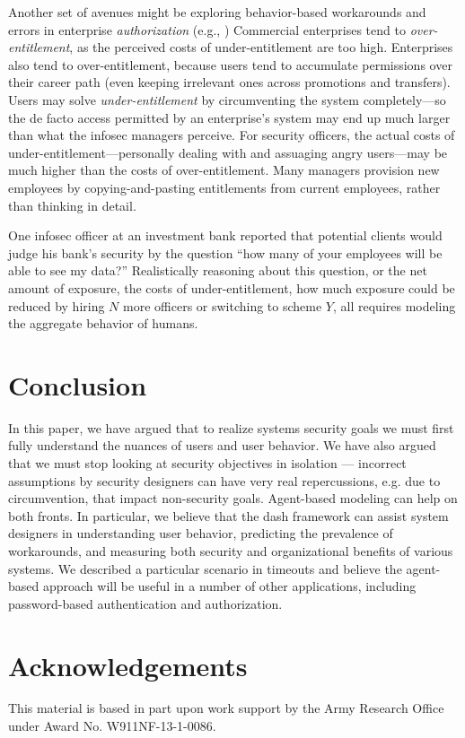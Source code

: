 \documentclass{acm_proc_article-sp}
\newcommand{\ignore}[1] {}
\begin{document}
Another set of avenues might be exploring behavior-based workarounds and 
errors in enterprise {\em authorization}
(e.g., \cite{SS08, Scout10, Scout08a})
Commercial enterprises tend to {\em over-entitlement}, as the perceived costs of under-entitlement are too high.
Enterprises also tend to over-entitlement, because users tend
to accumulate permissions over their career path (even keeping irrelevant ones across promotions and transfers).
Users may solve {\em under-entitlement} by circumventing the system completely---so the de facto access permitted by an enterprise's system may end up much larger than what the infosec managers perceive.
For security officers, the actual costs of under-entitlement---personally dealing with and assuaging angry users---may be much higher than the costs of over-entitlement.
Many managers provision new employees by copying-and-pasting 
entitlements from current employees, rather than thinking in detail.

One infosec officer at an investment bank reported that potential
clients would judge his bank's security by the question ``how many of
your employees will be able to see my data?''  Realistically
reasoning about this question, or the net amount of exposure, the
costs of under-entitlement, how much exposure could be reduced by
hiring $N$ more officers or switching to scheme $Y$, all requires 
modeling the aggregate behavior of humans.

\ignore{(Indeed, X.509 PKI has often been lamented as costing too many
man-hours when deployed in practice, in large enterprises.  Could our
approach help explain this, and then help guide designers to reduce
these costs?)}

\ignore{BCMA....}

\section{Conclusion}
\label{sec-conclusion}

In this paper, we have argued that to realize systems
security goals we must first fully understand the nuances of users and
user behavior.  We have also argued that we must stop looking at
security objectives in isolation --- incorrect assumptions by security
designers can have very real repercussions, e.g. due to circumvention,
that impact non-security goals. Agent-based modeling can help on both
fronts. In particular, we believe that the {\sc dash} framework can
assist system designers in understanding user behavior, predicting the
prevalence of workarounds, and measuring both security and
organizational benefits of various systems. We described a particular
scenario in timeouts and believe the agent-based approach will be
useful in a number of other applications, including password-based
authentication and authorization.

\section{Acknowledgements}
\label{sec-acks}

This material is based in part upon work support by the Army Research
Office under Award No. {\small W911NF-13-1-0086}.

\small




\end{document}
